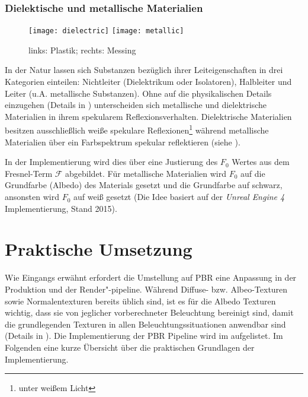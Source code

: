 \subsubsection{Dielektische und metallische Materialien}\label{sec:pbr-dielektisch}

\begin{figure}
	\texttt{[image: dielectric]}
	\texttt{[image: metallic]}
	\caption[Dielektische und metallische Materialien]{links: Plastik; rechts: Messing}
	\label{fig:dielectric-metallic}
\end{figure}

In der Natur lassen sich Substanzen bezüglich ihrer Leiteigenschaften in drei Kategorien einteilen: Nichtleiter (Dielektrikum oder Isolatoren), Halbleiter und Leiter (u.A. metallische Substanzen). Ohne auf die physikalischen Details einzugehen (Details in \cite[Abschnitt: Glanz und Farbe der Metalle]{Zawischa2011}) unterscheiden sich metallische und dielektrische Materialien in ihrem spekularem Reflexionsverhalten. Dielektrische Materialien besitzen ausschließlich weiße spekulare Reflexionen\footnote{unter weißem Licht} während metallische Materialien über ein Farbspektrum spekular reflektieren \parencite[Abschnitt: Specular]{Lagarde2011a}(siehe ).

In der Implementierung wird dies über eine Justierung des $F_0$ Wertes aus dem Fresnel-Term $\mathcal{F}$ abgebildet. Für metallische Materialien wird $F_0$ auf die Grundfarbe (Albedo) des Materials gesetzt und die Grundfarbe auf schwarz, ansonsten wird $F_0$ auf weiß gesetzt (Die Idee basiert auf der \textit{Unreal Engine 4} Implementierung, Stand 2015).

\section{Praktische Umsetzung}
\label{sec:pbr-umsetzung}

Wie Eingangs erwähnt erfordert die Umstellung auf \ac{PBR} eine Anpassung in der Produktion und der Render"-pipeline. Während Diffuse- bzw. Albeo-Texturen sowie Normalentexturen bereits üblich sind, ist es für die Albedo Texturen wichtig, dass sie von jeglicher vorberechneter Beleuchtung bereinigt sind, damit die grundlegenden Texturen in allen Beleuchtungssituationen anwendbar sind (Details in \cite{Lagarde2011}). Die Implementierung der \ac{PBR} Pipeline wird im  aufgelistet. Im Folgenden eine kurze Übersicht über die praktischen Grundlagen der Implementierung.

